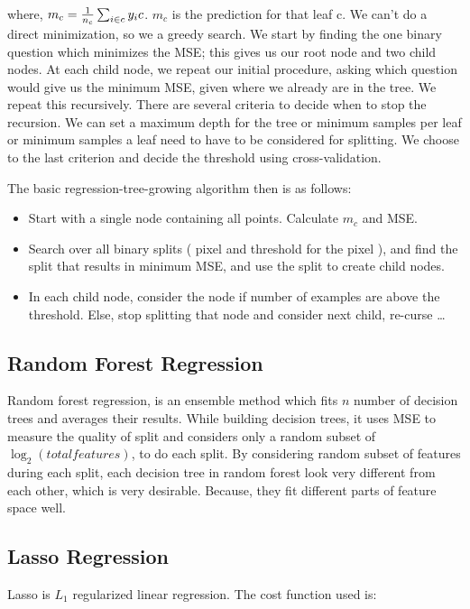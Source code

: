 \documentclass[10pt]{article}
\begin{document}
where, $m_c =  {1 \over n_c} \sum_{i \in c} y_ic$. $m_c$ is the prediction for that leaf c. We can't do a direct minimization, so we a greedy search. We start by finding the one binary question which minimizes the MSE; this gives us our root node and two child nodes. At each child node, we repeat our initial procedure, asking which question would give us the minimum MSE, given where we already are in the tree. We repeat this recursively. There are several criteria to decide when to stop the recursion. We can set a maximum depth for the tree or minimum samples per leaf or minimum samples a leaf need to have to be considered for splitting. We choose to the last criterion and decide the threshold using cross-validation.

The basic regression-tree-growing algorithm then is as follows:

\begin{itemize}
  \item Start with a single node containing all points. Calculate $m_c$ and MSE.
  \item Search over all binary splits ( pixel and threshold for the pixel ), and find the split that results in minimum MSE, and use the split to create child nodes.
  \item In each child node, consider the node if number of examples are above the threshold. Else, stop splitting that node and consider next child, re-curse \ldots
\end{itemize}

\subsection*{Random Forest Regression} 

Random forest regression, is an ensemble method which fits $n$ number of decision trees and averages their results. While building decision trees, it uses MSE to measure the quality of split and considers only a random subset of $ \log_2(total features)$, to do each split. By considering random subset of features during each split, each decision tree in random forest look very different from each other, which is very desirable. Because, they fit different parts of feature space well.  

\subsection*{Lasso Regression}

Lasso is $L_1$ regularized linear regression. The cost function used is:
\end{document}
